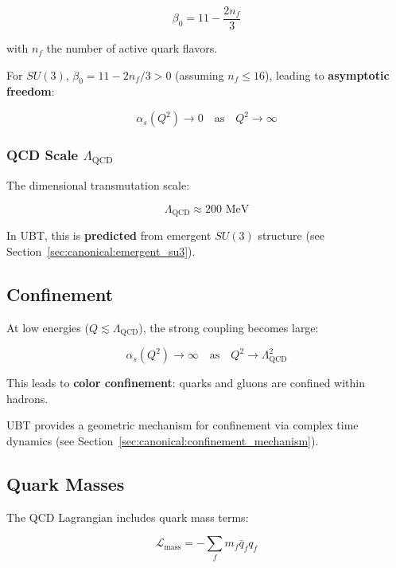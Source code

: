 \begin{equation}
\beta_0 = 11 - \frac{2n_f}{3}
\end{equation}

with $n_f$ the number of active quark flavors.

For $SU(3)$, $\beta_0 = 11 - 2n_f/3 > 0$ (assuming $n_f \leq 16$), leading to \textbf{asymptotic freedom}:

\begin{equation}
\alpha_s(Q^2) \to 0 \quad \text{as} \quad Q^2 \to \infty
\end{equation}

\subsubsection{QCD Scale $\Lambda_{\text{QCD}}$}

The dimensional transmutation scale:

\begin{equation}
\label{eq:canonical:lambda_qcd}
\Lambda_{\text{QCD}} \approx 200 \text{ MeV}
\end{equation}

In UBT, this is \textbf{predicted} from emergent $SU(3)$ structure (see Section~\ref{sec:canonical:emergent_su3}).

\subsection{Confinement}

At low energies ($Q \lesssim \Lambda_{\text{QCD}}$), the strong coupling becomes large:

\begin{equation}
\alpha_s(Q^2) \to \infty \quad \text{as} \quad Q^2 \to \Lambda_{\text{QCD}}^2
\end{equation}

This leads to \textbf{color confinement}: quarks and gluons are confined within hadrons.

UBT provides a geometric mechanism for confinement via complex time dynamics (see Section~\ref{sec:canonical:confinement_mechanism}).

\subsection{Quark Masses}

The QCD Lagrangian includes quark mass terms:

\begin{equation}
\label{eq:canonical:qcd_mass}
\mathcal{L}_{\text{mass}} = -\sum_{f} m_f \bar{q}_f q_f
\end{equation}

